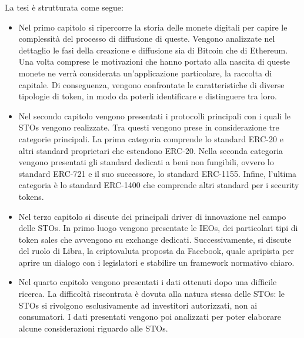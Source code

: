 La tesi è strutturata come segue:
\begin{itemize}
    \item Nel primo capitolo si ripercorre la storia delle monete digitali per capire le complessità del processo di diffusione di queste. Vengono analizzate nel dettaglio le fasi della creazione e diffusione sia di Bitcoin che di Ethereum. Una volta comprese le motivazioni che hanno portato alla nascita di queste monete ne verrà considerata un'applicazione particolare, la raccolta di capitale. Di conseguenza, vengono confrontate le caratteristiche di diverse tipologie di token, in modo da poterli identificare e distinguere tra loro. 
    
    \item Nel secondo capitolo vengono presentati i protocolli principali con i quali le STOs vengono realizzate. Tra questi vengono prese in considerazione tre categorie principali. La prima categoria comprende lo standard ERC-20 e altri standard proprietari che estendono ERC-20. Nella seconda categoria vengono presentati gli standard dedicati a beni non fungibili, ovvero lo standard ERC-721 e il suo successore, lo standard ERC-1155. Infine, l'ultima categoria è lo standard ERC-1400 che comprende altri standard per i security tokens. 
    
    \item Nel terzo capitolo si discute dei principali driver di innovazione nel campo delle STOs. In primo luogo vengono presentate le IEOs, dei particolari tipi di token sales che avvengono su exchange dedicati.  Successivamente, si discute del ruolo di Libra, la criptovaluta proposta da Facebook, quale apripista per aprire un dialogo con i legislatori e stabilire un framework normativo chiaro. 
    
    \item Nel quarto capitolo vengono presentati i dati 
    ottenuti dopo una difficile ricerca. La difficoltà riscontrata è dovuta alla natura stessa delle STOs: le STOs si rivolgono esclusivamente ad investitori autorizzati, non ai consumatori. I dati presentati vengono poi analizzati per poter elaborare alcune considerazioni riguardo alle STOs. 
\end{itemize}

\clearpage{\pagestyle{empty}\cleardoublepage}
